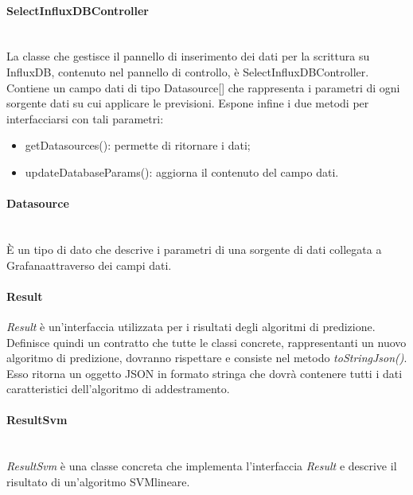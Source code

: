 \paragraph*{SelectInfluxDBController} \mbox{}\\ [1mm]
La classe che gestisce il pannello di inserimento dei dati per la scrittura su InfluxDB, contenuto nel pannello di controllo, è SelectInfluxDBController.
Contiene un campo dati di tipo Datasource[] che rappresenta i parametri di ogni sorgente dati su cui applicare le previsioni. Espone infine i due metodi per interfacciarsi con tali parametri:
\begin{itemize}
	\item getDatasources(): permette di ritornare i dati;
	\item updateDatabaseParams(): aggiorna il contenuto del campo dati.
\end{itemize}
\paragraph*{Datasource} \mbox{}\\ [1mm]
È un tipo di dato che descrive i parametri di una sorgente di dati collegata a Grafana\glosp attraverso dei campi dati.
\paragraph*{Result}
\textit{Result} è un'interfaccia utilizzata per i risultati degli algoritmi di predizione. Definisce quindi un contratto che tutte le classi concrete, rappresentanti un nuovo algoritmo di predizione, dovranno rispettare e consiste nel metodo \textit{toStringJson()}. Esso ritorna un oggetto JSON in formato stringa che dovrà contenere tutti i dati caratteristici dell'algoritmo di addestramento.
\paragraph*{ResultSvm} \mbox{}\\ [1mm]
\textit{ResultSvm} è una classe concreta che implementa l'interfaccia \textit{Result} e descrive il risultato di un'algoritmo SVM\glosp lineare.
